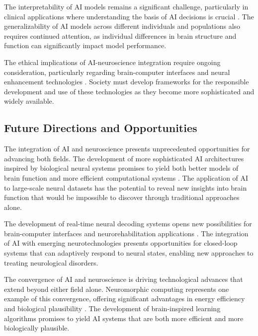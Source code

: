 \documentclass[conference]{IEEEtran}
\begin{document}
The interpretability of AI models remains a significant challenge, particularly in clinical applications where understanding the basis of AI decisions is crucial \citep{sadeghiReviewExplainableArtificial2024}. The generalizability of AI models across different individuals and populations also requires continued attention, as individual differences in brain structure and function can significantly impact model performance.

The ethical implications of AI-neuroscience integration require ongoing consideration, particularly regarding brain-computer interfaces and neural enhancement technologies \citep{gordonEthicalConsiderationsUse2024}. Society must develop frameworks for the responsible development and use of these technologies as they become more sophisticated and widely available.

\subsection{Future Directions and Opportunities}

The integration of AI and neuroscience presents unprecedented opportunities for advancing both fields. The development of more sophisticated AI architectures inspired by biological neural systems promises to yield both better models of brain function and more efficient computational systems \citep{schmidgallBraininspiredLearningArtificial2024}. The application of AI to large-scale neural datasets has the potential to reveal new insights into brain function that would be impossible to discover through traditional approaches alone.

The development of real-time neural decoding systems opens new possibilities for brain-computer interfaces and neurorehabilitation applications \citep{zhangBrainComputerInterfaces2024}. The integration of AI with emerging neurotechnologies presents opportunities for closed-loop systems that can adaptively respond to neural states, enabling new approaches to treating neurological disorders.

The convergence of AI and neuroscience is driving technological advances that extend beyond either field alone. Neuromorphic computing represents one example of this convergence, offering significant advantages in energy efficiency and biological plausibility \citep{daviesLoihiNeuromorphicManycore2018}. The development of brain-inspired learning algorithms promises to yield AI systems that are both more efficient and more biologically plausible.
\end{document}

